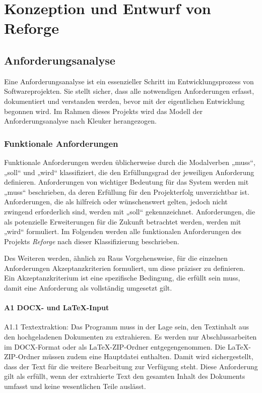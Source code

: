 \chapter{Konzeption und Entwurf von Reforge}
\section{Anforderungsanalyse}
Eine Anforderungsanalyse ist ein essenzieller Schritt im Entwicklungsprozess von Softwareprojekten. Sie stellt sicher, dass alle notwendigen Anforderungen erfasst, dokumentiert und verstanden werden, bevor mit der eigentlichen Entwicklung begonnen wird. Im Rahmen dieses Projekts wird das Modell der Anforderungsanalyse nach Kleuker herangezogen. \cite[S.51 ff.]{kleuker2013anforderungsanalyse}

\subsection{Funktionale Anforderungen}
\label{subs:funktionaleAnfoderungen}
 Funktionale Anforderungen werden üblicherweise durch die Modalverben „muss“, „soll“ und „wird“ klassifiziert, die den Erfüllungsgrad der jeweiligen Anforderung definieren. Anforderungen von wichtiger Bedeutung für das System werden mit „muss“ beschrieben, da deren Erfüllung für den Projekterfolg unverzichtbar ist. Anforderungen, die als hilfreich oder wünschenswert gelten, jedoch nicht zwingend erforderlich sind, werden mit „soll“ gekennzeichnet. Anforderungen, die als potenzielle Erweiterungen für die Zukunft betrachtet werden, werden mit „wird“ formuliert. Im Folgenden werden alle funktionalen Anforderungen des Projekts \textit{Reforge} nach dieser Klassifizierung beschrieben. \cite[S.71 ff.]{kleuker2013anforderungsanalyse}

 Des Weiteren werden, ähnlich zu Raus Vorgehensweise, für die einzelnen Anforderungen Akzeptanzkriterien formuliert, um diese präziser zu definieren. Ein Akzeptanzkriterium ist eine spezifische Bedingung, die erfüllt sein muss, damit eine Anforderung als vollständig umgesetzt gilt. \cite[S.49]{rau2016agile}

\subsubsection{A1 DOCX- und LaTeX-Input}

A1.1 Textextraktion: Das Programm muss in der Lage sein, den Textinhalt aus den hochgeladenen Dokumenten zu extrahieren. Es werden nur Abschlussarbeiten im DOCX-Format oder als LaTeX-ZIP-Ordner entgegengenommen. Die LaTeX-ZIP-Ordner müssen zudem eine Hauptdatei enthalten. Damit wird sichergestellt, dass der Text für die weitere Bearbeitung zur Verfügung steht. Diese Anforderung gilt als erfüllt, wenn der extrahierte Text den gesamten Inhalt des Dokuments umfasst und keine wesentlichen Teile auslässt.
 
